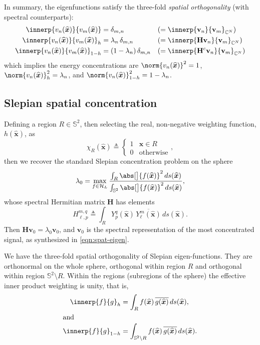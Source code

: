 \documentclass[10pt, twocolumn, twoside]{IEEEtran}
\newcommand{\untsph}{\mathbb{S}^{2}} %
\newcommand{\unit}[1]{\widehat{\bm{#1}}}
\newcommand{\cmplx}{\mathbb{C}} %
\newcommand{\dfn}{\triangleq}
\newcommand{\conj}[1]{\overline{#1}} %
\begin{document}
In summary, the eigenfunctions satisfy the three-fold \emph{spatial orthogonality} (with spectral counterparts):
\begin{align*}
	\innerp{v_n(\unit{x})}{v_m(\unit{x})}&=\delta_{m,n}
		&&(= \innerp{\mathbf{v}_n}{\mathbf{v}_m}_{\cmplx^N})\\
	\innerp{v_n(\unit{x})}{v_m(\unit{x})}_h&=\lambda_n\,\delta_{m,n}
		&&(=\innerp{\mathbf{H}\mathbf{v}_n}{\mathbf{v}_m}_{\cmplx^N})\\
	\innerp{v_n(\unit{x})}{v_m(\unit{x})}_{1-h}&=(1-\lambda_n)\,\delta_{m,n}
		&&(=\innerp{\mathbf{H}^{c}\mathbf{v}_n}{\mathbf{v}_m}_{\cmplx^N})
\end{align*}
which implies the energy concentrations are $\norm{v_n(\unit{x})}^2=1$, $\norm{v_n(\unit{x})}_h^2=\lambda_n$, and $\norm{v_n(\unit{x})}_{1-h}^2=1-\lambda_n$.

\subsection{Slepian spatial concentration}

Defining a region $R\in\untsph$, then selecting the real, non-negative weighting function, $h(\unit{x})$, as
\begin{equation}
\label{eqn:indicator}
	\chi^{}_{R}(\unit{x}) \dfn
	\begin{cases}
		1 & \unit{x}\in R \\
		0 & \text{otherwise}
	\end{cases},
\end{equation}
then we recover the standard Slepian concentration problem on the sphere\cite{Kennedy-book:2013}
\begin{equation}
\label{eqn:conc-spat-slep}
	\lambda_0
		=\max_{f\in\mathcal{H}_{L}}\frac{\int_{R} \abs[\big]{f(\unit{x})}^2\,ds(\unit{x})}%
		{\int_{\untsph} \abs[\big]{f(\unit{x})}^2\,ds(\unit{x})},
\end{equation}
whose spectral Hermitian matrix $\mathbf{H}$ has elements
\begin{equation}
\label{eqn:W-matrix-slep}
	H_{\ell,p}^{m,q} \dfn \int_{R} Y_{p}^{q}(\unit{x})\,
		\conj{Y_{\ell}^{m}(\unit{x})}\,ds(\unit{x}).
\end{equation}
Then $\mathbf{H}\mathbf{v}_0=\lambda_0\mathbf{v}_0$, and $\mathbf{v}_0$ is the spectral representation of the most concentrated signal, as synthesized in \eqref{eqn:spat-eigen}.

We have the three-fold spatial orthogonality of Slepian eigen-functions.  They are orthonormal on the whole sphere, orthogonal within region $R$ and orthogonal within region $\untsph\setminus{}R$.
Within the regions (subregions of the sphere) the effective inner product weighting is unity, that is,
\begin{align*}
	\innerp{f}{g}_{h} 
		&=\int_{R} f(\unit{x})\,\conj{g(\unit{x})}\,ds(\unit{x}), \\
		\shortintertext{and}
	\innerp{f}{g}_{1-h} 
		&=\int_{\untsph\setminus{}R} f(\unit{x})\,\conj{g(\unit{x})}\,ds(\unit{x}).
\end{align*}
\end{document}
